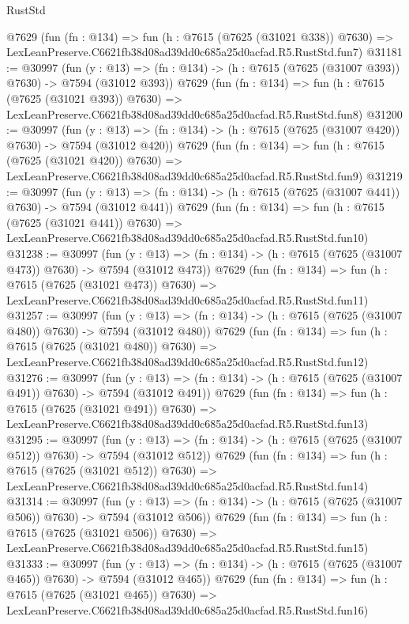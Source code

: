 \begin{lexlean}{RustStd}
\begin{coremodule}
    @7629
    (fun (fn : @134) =>
    fun (h : @7615 (@7625 (@31021 @338)) @7630) =>
    LexLeanPreserve.C6621fb38d08ad39dd0c685a25d0acfad.R5.RustStd.fun7)
@31181 := @30997
    (fun (y : @13) => (fn : @134) -> (h : @7615 (@7625 (@31007 @393)) @7630) -> @7594 (@31012 @393))
    @7629
    (fun (fn : @134) =>
    fun (h : @7615 (@7625 (@31021 @393)) @7630) =>
    LexLeanPreserve.C6621fb38d08ad39dd0c685a25d0acfad.R5.RustStd.fun8)
@31200 := @30997
    (fun (y : @13) => (fn : @134) -> (h : @7615 (@7625 (@31007 @420)) @7630) -> @7594 (@31012 @420))
    @7629
    (fun (fn : @134) =>
    fun (h : @7615 (@7625 (@31021 @420)) @7630) =>
    LexLeanPreserve.C6621fb38d08ad39dd0c685a25d0acfad.R5.RustStd.fun9)
@31219 := @30997
    (fun (y : @13) => (fn : @134) -> (h : @7615 (@7625 (@31007 @441)) @7630) -> @7594 (@31012 @441))
    @7629
    (fun (fn : @134) =>
    fun (h : @7615 (@7625 (@31021 @441)) @7630) =>
    LexLeanPreserve.C6621fb38d08ad39dd0c685a25d0acfad.R5.RustStd.fun10)
@31238 := @30997
    (fun (y : @13) => (fn : @134) -> (h : @7615 (@7625 (@31007 @473)) @7630) -> @7594 (@31012 @473))
    @7629
    (fun (fn : @134) =>
    fun (h : @7615 (@7625 (@31021 @473)) @7630) =>
    LexLeanPreserve.C6621fb38d08ad39dd0c685a25d0acfad.R5.RustStd.fun11)
@31257 := @30997
    (fun (y : @13) => (fn : @134) -> (h : @7615 (@7625 (@31007 @480)) @7630) -> @7594 (@31012 @480))
    @7629
    (fun (fn : @134) =>
    fun (h : @7615 (@7625 (@31021 @480)) @7630) =>
    LexLeanPreserve.C6621fb38d08ad39dd0c685a25d0acfad.R5.RustStd.fun12)
@31276 := @30997
    (fun (y : @13) => (fn : @134) -> (h : @7615 (@7625 (@31007 @491)) @7630) -> @7594 (@31012 @491))
    @7629
    (fun (fn : @134) =>
    fun (h : @7615 (@7625 (@31021 @491)) @7630) =>
    LexLeanPreserve.C6621fb38d08ad39dd0c685a25d0acfad.R5.RustStd.fun13)
@31295 := @30997
    (fun (y : @13) => (fn : @134) -> (h : @7615 (@7625 (@31007 @512)) @7630) -> @7594 (@31012 @512))
    @7629
    (fun (fn : @134) =>
    fun (h : @7615 (@7625 (@31021 @512)) @7630) =>
    LexLeanPreserve.C6621fb38d08ad39dd0c685a25d0acfad.R5.RustStd.fun14)
@31314 := @30997
    (fun (y : @13) => (fn : @134) -> (h : @7615 (@7625 (@31007 @506)) @7630) -> @7594 (@31012 @506))
    @7629
    (fun (fn : @134) =>
    fun (h : @7615 (@7625 (@31021 @506)) @7630) =>
    LexLeanPreserve.C6621fb38d08ad39dd0c685a25d0acfad.R5.RustStd.fun15)
@31333 := @30997
    (fun (y : @13) => (fn : @134) -> (h : @7615 (@7625 (@31007 @465)) @7630) -> @7594 (@31012 @465))
    @7629
    (fun (fn : @134) =>
    fun (h : @7615 (@7625 (@31021 @465)) @7630) =>
    LexLeanPreserve.C6621fb38d08ad39dd0c685a25d0acfad.R5.RustStd.fun16)

\end{coremodule}
\end{lexlean}
